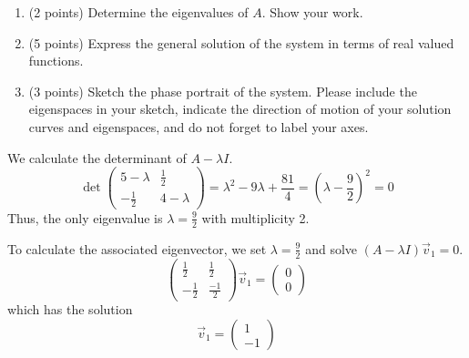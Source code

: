 \documentclass[11pt, titlepage]{article}
\begin{document}
\begin{enumerate}
        \begin{enumerate}[label={(\alph*)}]
            \item (2 points) Determine the eigenvalues of $A$. Show your work.

            \item (5 points) Express the general solution of the system in terms of real valued functions.

            \item (3 points) Sketch the phase portrait of the system.
            Please include the eigenspaces in your sketch, indicate the direction of motion of your solution curves and eigenspaces, and do not forget to label your axes.
        \end{enumerate}

        \begin{solution}
            We calculate the determinant of $A - \lambda I$.
            \[
            \det
            \begin{pmatrix}
                5 - \lambda & \frac{1}{2} \\
                -\frac{1}{2} & 4 - \lambda
            \end{pmatrix} = \lambda^2 - 9\lambda + \frac{81}{4} = \left( \lambda - \frac{9}{2} \right)^2 = 0
            \]
            Thus, the only eigenvalue is $\lambda = \frac{9}{2}$ with multiplicity 2.

            To calculate the associated eigenvector, we set $\lambda = \frac{9}{2}$ and solve $(A - \lambda I) \vec{v}_1 = 0$.
            \[
            \begin{pmatrix}
                \frac{1}{2} & \frac{1}{2} \\
                -\frac{1}{2} & \frac{-1}{2}
            \end{pmatrix} \vec{v}_1 =
            \begin{pmatrix}
                0 \\
                0
            \end{pmatrix}
            \]
            which has the solution
            \[
            \vec{v}_1 =
            \begin{pmatrix}
                1 \\
                -1
            \end{pmatrix}
            \]


\end{solution}
\end{enumerate}
\end{document}
